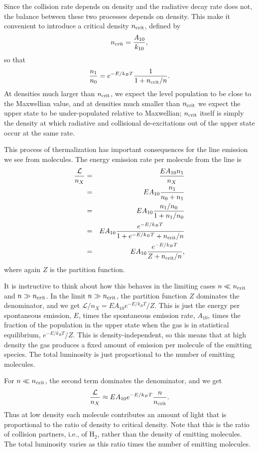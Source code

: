 Since the collision rate depends on density and the radiative decay rate does not, the balance between these two processes depends on density. This make it convenient to introduce a critical density $n_{\rm crit}$, defined by
\begin{equation}
\label{eq:ncrit}
n_{\rm crit} = \frac{A_{10}}{k_{10}},
\end{equation}
so that
\begin{equation}
\frac{n_1}{n_0} = e^{-E/k_B T} \frac{1}{1+n_{\rm crit}/n}.
\end{equation}
At densities much larger than $n_{\rm crit}$, we expect the level population to be close to the Maxwellian value, and at densities much smaller than $n_{\rm crit}$ we expect the upper state to be under-populated relative to Maxwellian; $n_{\rm crit}$ itself is simply the density at which radiative and collisional de-excitations out of the upper state occur at the same rate.

This process of thermalization has important consequences for the line emission we see from molecules. The energy emission rate per molecule from the line is 
\begin{eqnarray}
\frac{\mathcal{L}}{n_X} & = & \frac{E A_{10} n_1}{n_X} \\
& = & E A_{10} \frac{n_1}{n_0+n_1} \\
& = & E A_{10} \frac{n_1/n_0}{1+n_1/n_0} \\
& = & E A_{10} \frac{e^{-E/k_B T}}{1+e^{-E/k_B T}+n_{\rm crit}/n} \\
& = & E A_{10} \frac{e^{-E/k_B T}}{Z+n_{\rm crit}/n},
\end{eqnarray}
where again $Z$ is the partition function.

It is instructive to think about how this behaves in the limiting cases $n \ll n_{\rm crit}$ and $n\gg n_{\rm crit}$. In the limit $n\gg n_{\rm crit}$, the partition function $Z$ dominates the denominator, and we get $\mathcal{L}/n_X = E A_{10} e^{-E/k_B T}/Z$. This is just the energy per spontaneous emission, $E$, times the spontaneous emission rate, $A_{10}$, times the fraction of the population in the upper state when the gas is in statistical equilibrium, $e^{-E/k_B T}/Z$. This is density-independent, so this means that at high density the gas produces a fixed amount of emission per molecule of the emitting species. The total luminosity is just proportional to the number of emitting molecules.

For $n \ll n_{\rm crit}$, the second term dominates the denominator, and we get
\begin{equation}
\label{eq:cool_lowden}
\frac{\mathcal{L}}{n_X} \approx E A_{10} e^{-E/k_B T} \frac{n}{n_{\rm crit}}.
\end{equation}
Thus at low density each molecule contributes an amount of light that is proportional to the ratio of density to critical density. Note that this is the ratio of collision partners, i.e., of H$_2$, rather than the density of emitting molecules. The total luminosity varies as this ratio times the number of emitting molecules.


